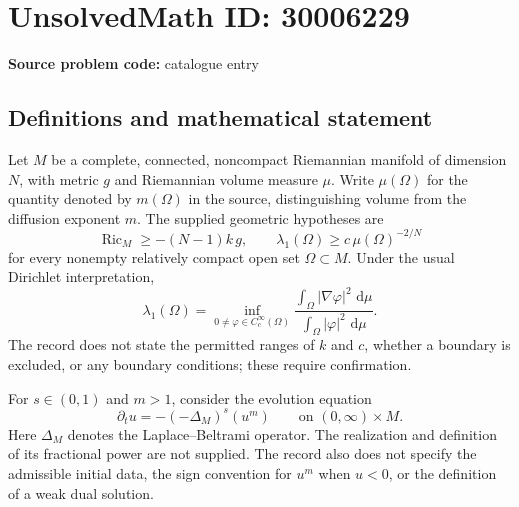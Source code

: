 \documentclass[11pt]{article}
\newcommand{\dd}{\,\mathrm{d}}
\begin{document}
\section*{UnsolvedMath ID: 30006229}
\textbf{Source problem code:} catalogue entry
\subsection{Definitions and mathematical statement}
Let \(M\) be a complete, connected, noncompact Riemannian manifold of dimension \(N\), with metric \(g\) and Riemannian volume measure \(\mu\). Write \(\mu(\Omega)\) for the quantity denoted by \(m(\Omega)\) in the source, distinguishing volume from the diffusion exponent \(m\). The supplied geometric hypotheses are
\[
\operatorname{Ric}_M\geq -(N-1)k\,g,
\qquad
\lambda_1(\Omega)\geq c\,\mu(\Omega)^{-2/N}
\]
for every nonempty relatively compact open set \(\Omega\subset M\). Under the usual Dirichlet interpretation,
\[
\lambda_1(\Omega)=\inf_{0\ne\varphi\in C_c^\infty(\Omega)}
\frac{\int_\Omega |\nabla\varphi|^2\,\dd\mu}
{\int_\Omega |\varphi|^2\,\dd\mu}.
\]
The record does not state the permitted ranges of \(k\) and \(c\), whether a boundary is excluded, or any boundary conditions; these require confirmation.

For \(s\in(0,1)\) and \(m>1\), consider the evolution equation
\[
\partial_t u=-(-\Delta_M)^s(u^m)
\qquad\text{on }(0,\infty)\times M.
\]
Here \(\Delta_M\) denotes the Laplace--Beltrami operator. The realization and definition of its fractional power are not supplied. The record also does not specify the admissible initial data, the sign convention for \(u^m\) when \(u<0\), or the definition of a weak dual solution.
\end{document}
